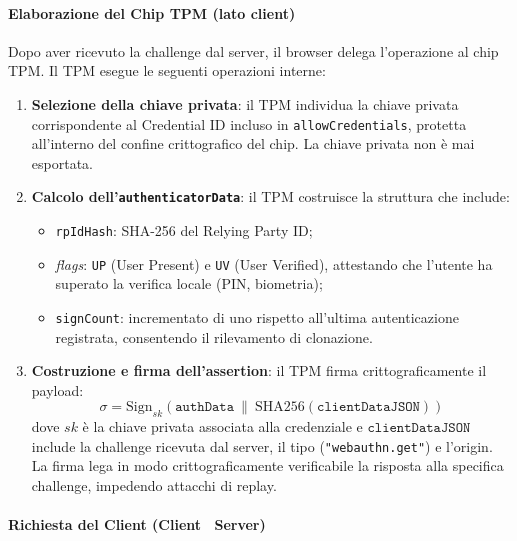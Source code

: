 \paragraph{Elaborazione del Chip TPM (lato client)}

Dopo aver ricevuto la challenge dal server, il browser delega l'operazione
al chip TPM. Il TPM esegue le seguenti operazioni interne:

\begin{enumerate}
  \item \textbf{Selezione della chiave privata}: il TPM individua la
    chiave privata corrispondente al Credential ID incluso in
    \texttt{allowCredentials}, protetta all'interno del confine
    crittografico del chip. La chiave privata non è mai esportata.

  \item \textbf{Calcolo dell'\texttt{authenticatorData}}: il TPM
    costruisce la struttura che include:
    \begin{itemize}
      \item \texttt{rpIdHash}: SHA-256 del Relying Party ID;
      \item \emph{flags}: \texttt{UP} (User Present) e \texttt{UV}
        (User Verified), attestando che l'utente ha superato la
        verifica locale (PIN, biometria);
      \item \texttt{signCount}: incrementato di uno rispetto all'ultima
        autenticazione registrata, consentendo il rilevamento di clonazione.
    \end{itemize}

  \item \textbf{Costruzione e firma dell'assertion}: il TPM firma
    crittograficamente il payload:
    \[
      \sigma = \mathrm{Sign}_{\mathit{sk}}\!\left(\texttt{authData}\ \|\ \mathrm{SHA256}(\texttt{clientDataJSON})\right)
    \]
    dove $\mathit{sk}$ è la chiave privata associata alla credenziale
    e $\texttt{clientDataJSON}$ include la challenge ricevuta dal server,
    il tipo (\texttt{"webauthn.get"}) e l'origin. La firma lega in modo
    crittograficamente verificabile la risposta alla specifica challenge,
    impedendo attacchi di replay.
\end{enumerate}

\paragraph{Richiesta del Client (Client \textrightarrow\ Server)}

